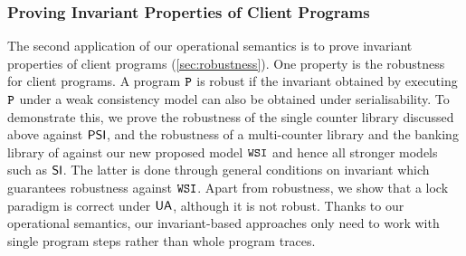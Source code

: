 \subsubsection{Proving Invariant Properties of Client Programs} 
The second application of our operational semantics is to prove
invariant properties of client programs (\cref{sec:robustness}).
One property is the robustness for client programs. %
A program \(\mathtt{P}\) is robust if the invariant obtained 
by executing \(\mathtt{P}\) under a weak consistency model can also be obtained under serialisability.
To demonstrate this, we prove the robustness of the single
counter library discussed above against \(\mathsf{PSI}\), 
and the robustness of a multi-counter library and the banking library of \citet{bank-example-wsi}
against our new proposed model \(\mathtt{WSI}\) and hence all stronger models such as \(\mathsf{SI}\).
The latter is done through general conditions on invariant which guarantees robustness against \( \mathtt{WSI} \).
Apart from robustness,
we show that a lock paradigm is correct under \( \mathsf{UA} \), 
although it is not robust.
Thanks to our operational semantics, 
our invariant-based approaches only need to work with single program steps 
rather than whole program traces.
